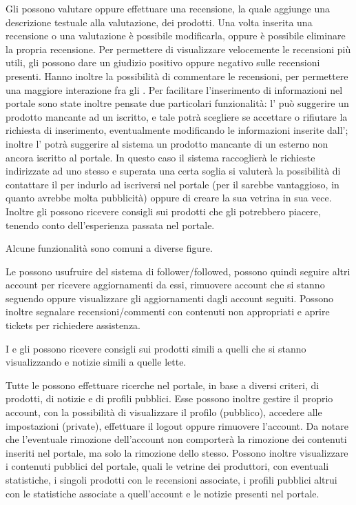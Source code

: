 Gli  possono valutare oppure effettuare una recensione, la quale aggiunge una descrizione testuale alla valutazione, dei prodotti. Una volta inserita una recensione o una valutazione è possibile modificarla, oppure è possibile eliminare la propria recensione. 
Per permettere di visualizzare velocemente le recensioni più utili, gli  possono dare un giudizio positivo oppure negativo sulle recensioni presenti. Hanno inoltre la possibilità di commentare le recensioni, per permettere una maggiore interazione fra gli .
Per facilitare l'inserimento di informazioni nel portale sono state inoltre pensate due particolari funzionalità: l' può suggerire un prodotto mancante ad un  iscritto, e tale  potrà scegliere se accettare o rifiutare la richiesta di inserimento, eventualmente modificando le informazioni inserite dall'; inoltre l' potrà suggerire al sistema un prodotto mancante di un  esterno non ancora iscritto al portale. In questo caso il sistema raccoglierà le richieste indirizzate ad uno stesso  e superata una certa soglia si valuterà la possibilità di contattare il  per indurlo ad iscriversi nel portale (per il  sarebbe vantaggioso, in quanto avrebbe molta pubblicità) oppure di creare la sua vetrina in sua vece.
Inoltre gli  possono ricevere consigli sui prodotti che gli potrebbero piacere, tenendo conto dell'esperienza passata nel portale. 

\bigskip
\noindent
Alcune funzionalità sono comuni a diverse figure.

Le  possono usufruire del sistema di follower/followed, possono quindi seguire altri account per ricevere aggiornamenti da essi, rimuovere account che si stanno seguendo oppure visualizzare gli aggiornamenti dagli account seguiti. Possono inoltre segnalare recensioni/commenti con contenuti non appropriati e aprire tickets per richiedere assistenza.

I  e gli  possono ricevere consigli sui prodotti simili a quelli che si stanno visualizzando e notizie simili a quelle lette. 

Tutte le  possono effettuare ricerche nel portale, in base a diversi criteri, di prodotti, di notizie e di profili pubblici.
Esse possono inoltre gestire il proprio account, con la possibilità di visualizzare il profilo (pubblico), accedere alle impostazioni (private), effettuare il logout oppure rimuovere l'account. Da notare che l'eventuale rimozione dell'account non comporterà la rimozione dei contenuti inseriti nel portale, ma solo la rimozione dello stesso. Possono inoltre visualizzare i contenuti pubblici del portale, quali le vetrine dei produttori, con eventuali statistiche, i singoli prodotti con le recensioni associate, i profili pubblici altrui con le statistiche associate a quell'account e le notizie presenti nel portale.

